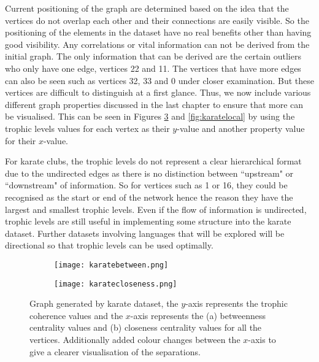 Current positioning of the graph are determined based on the idea that the vertices do not overlap each other and their connections are easily visible. So the positioning of the elements in the dataset have no real benefits other than having good visibility. Any correlations or vital information can not be derived from the initial graph. The only information that can be derived are the certain outliers who only have one edge, vertices 22 and 11. The vertices that have more edges can also be seen such as vertices 32, 33 and 0 under closer examination. But these vertices are difficult to distinguish at a first glance. Thus, we now include various different graph properties discussed in the last chapter to ensure that more can be visualised. This can be seen in Figures \ref{fig:karatecentrality} and \ref{fig:karatelocal} by using the trophic levels values for each vertex as their $y$-value and another property value for their $x$-value.

For karate clubs, the trophic levels do not represent a clear hierarchical format due to the undirected edges as there is no distinction between ``upstream" or ``downstream" of information. So for vertices such as 1 or 16, they could be recognised as the start or end of the network hence the reason they have the largest and smallest trophic levels. Even if the flow of information is undirected, trophic levels are still useful in implementing some structure into the karate dataset. Further datasets involving languages that will be explored will be directional so that trophic levels can be used optimally.

\begin{figure}[!htb]
\centering
\begin{subfigure}{.45\textwidth}
	\hspace{-2cm}
	\texttt{[image: karatebetween.png]}
	\caption{}
	\label{fig:karatea}
\end{subfigure}
\begin{subfigure}{.45\textwidth}
	\texttt{[image: karatecloseness.png]}
	\caption{}
	\label{fig:karateb}
\end{subfigure}
\caption{Graph generated by karate dataset, the $y$-axis represents the trophic coherence values and the $x$-axis represents the (a) betweenness centrality values and (b) closeness centrality values for all the vertices. Additionally added colour changes between the $x$-axis to give a clearer visualisation of the separations.}
\label{fig:karatecentrality}
\end{figure}

